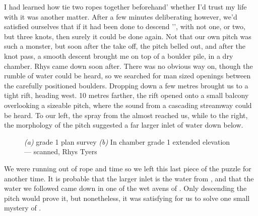     I had learned how tie two ropes together beforehand' whether I'd trust my life with it was another matter. After a few minutes deliberating however, we'd satisfied ourselves that if it had been done to descend '', with not one, or two, but three knots, then surely it could be done again. Not that our own pitch was such a monster, but soon after the take off, the pitch belled out, and after the knot pass, a smooth descent brought me on top of a boulder pile, in a dry chamber. Rhys came down soon after. There was no obvious way on, though the rumble of water could be heard, so we searched for man sized openings between the carefully positioned boulders. Dropping down a few metres brought us to a tight rift, heading west. 10 metres farther, the rift opened onto a small balcony overlooking a sizeable pitch, where the sound from a cascading streamway could be heard. To our left, the spray from the  almost reached us, while to the right, the morphology of the pitch suggested a far larger inlet of water down below. 

    \begin{figure}[t!]
        \checkoddpage \ifoddpage \forcerectofloat \else \forceversofloat \fi
        \centering
        \begin{subfigure}[t]{0.41\textwidth}
            \centering
            \caption{}\label{davyjones}
        \end{subfigure}
        \hfill
        \begin{subfigure}[t]{0.58\textwidth}
            \centering
            \caption{} \label{helmsdeep}
        \end{subfigure}

        \caption{
            \emph{(a)} \protect{} grade 1 plan survey 
            \emph{(b)} In \protect{} chamber grade 1 extended elevation --- scanned, Rhys Tyers 
        }
    \end{figure}


    We were running out of rope and time so we left this last piece of the puzzle for another time. It is probable that the larger inlet is the water from , and that the water we followed came down in one of the wet avens of . Only descending the pitch would prove it, but nonetheless, it was satisfying for us to solve one small mystery of . 